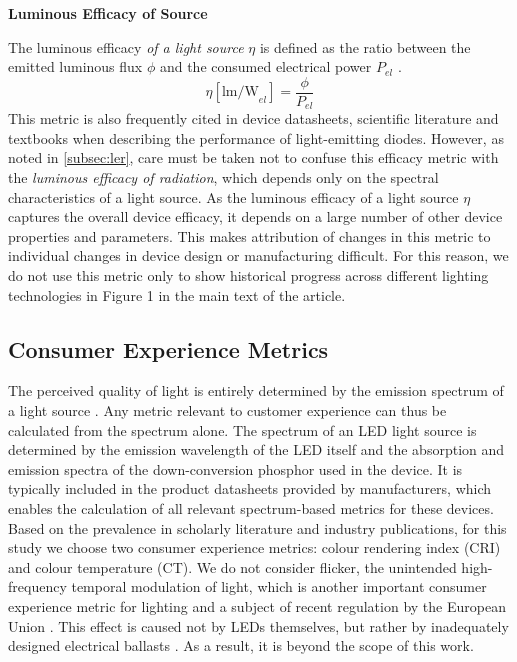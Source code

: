 \documentclass[parskip=full]{article}
\begin{document}
\textbf{Luminous Efficacy of Source}
\label{subsec:les}

The luminous efficacy \textit{of a light source} $\eta$ is defined as the ratio between the emitted luminous flux $\phi$ and the consumed electrical power $P_{el}$ \cite{cie-term-effsrc}.
%
\begin{equation}
    \eta [\text{lm/W}_{el}]= \frac{\phi}{P_{el}}
\end{equation}
%
This metric is also frequently cited in device datasheets, scientific literature and textbooks when describing the performance of light-emitting diodes. However, as noted in \cref{subsec:ler}, care must be taken not to confuse this efficacy metric with the \textit{luminous efficacy of radiation}, which depends only on the spectral characteristics of a light source. As the luminous efficacy of a light source $\eta$ captures the overall device efficacy, it depends on a large number of other device properties and parameters. This makes attribution of changes in this metric to individual changes in device design or manufacturing difficult. For this reason, we do not use this metric only to show historical progress across different lighting technologies in Figure 1 in the main text of the article.

\clearpage
\subsection{Consumer Experience Metrics}
\label{sec:metrics_consumer}

The perceived quality of light is entirely determined by the emission spectrum of a light source \cite{ies_handbook}. Any metric relevant to customer experience can thus be calculated from the spectrum alone. The spectrum of an LED light source is determined by the emission wavelength of the LED itself and the absorption and emission spectra of the down-conversion phosphor used in the device. It is typically included in the product datasheets provided by manufacturers, which enables the calculation of all relevant spectrum-based metrics for these devices. Based on the prevalence in scholarly literature and industry publications, for this study we choose two consumer experience metrics: colour rendering index (CRI) and colour temperature (CT). We do not consider flicker, the unintended high-frequency temporal modulation of light, which is another important consumer experience metric for lighting and a subject of recent regulation by the European Union \cite{weinold2020long}. This effect is caused not by LEDs themselves, but rather by inadequately designed electrical ballasts \cite{Lehman2014}. As a result, it is beyond the scope of this work. 
\end{document}
